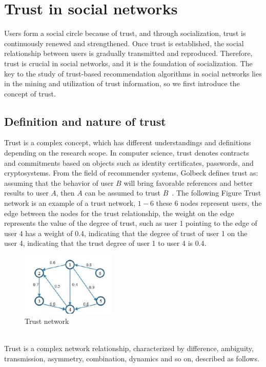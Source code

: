 \section{Trust in social networks}

Users form a social circle because of trust, and through socialization, trust is 
continuously renewed and strengthened. Once trust is established, the social relationship 
between users is gradually transmitted and reproduced\cite{b25, b27}. Therefore, trust is crucial in 
social networks, and it is the foundation of socialization\cite{b28}. The key to the study of 
trust-based recommendation algorithms in social networks lies in the mining and utilization 
of trust information, so we first introduce the concept of trust.

\subsection{Definition and nature of trust}
Trust is a complex concept, which has different understandings and definitions depending 
on the research scope. In computer science, trust denotes contracts and commitments 
based on objects such as identity certificates, passwords, and cryptosystems\cite{b29}. From the 
field of recommender systems, Golbeck defines trust as\cite{b18}: assuming that the behavior of user 
$B$ will bring favorable references and better results to user $A$, then $A$ can be assumed 
to trust $B$~\cite{b26}. The following Figure Trust network is an example 
of a trust network, $1 - 6$ these 6 nodes represent users, the edge between the nodes for the 
trust relationship, the weight on the edge represents the value of the degree of trust, such 
as user 1 pointing to the edge of user 4 has a weight of 0.4, indicating that the degree of 
trust of user 1 on the user 4, indicating that the trust degree of user 1 to user 4 is 0.4\cite{b15}.

\begin{figure}[H] %
    \centering %
    \includegraphics[width=0.4\textwidth]{figures/weight.png} %
    \caption{Trust network} %
    \label{Fig.2: Trust network} %
    \end{figure}
\\
Trust is a complex network relationship, characterized by difference, ambiguity, 
transmission, asymmetry, combination, dynamics and so on, described as follows\cite{b15, b18}.

